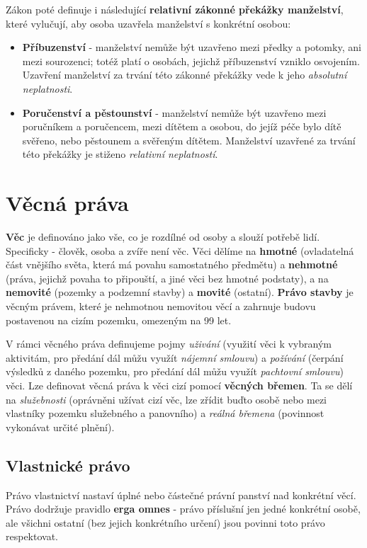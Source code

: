 Zákon poté definuje i následující \textbf{relativní zákonné překážky manželství}, které vylučují, aby osoba uzavřela manželství s konkrétní osobou:

\begin{itemize}
    \item \textbf{Příbuzenství} - manželství nemůže být uzavřeno mezi předky a potomky, ani mezi sourozenci; totéž platí o osobách, jejichž příbuzenství vzniklo osvojením. Uzavření manželství za trvání této zákonné překážky vede k jeho \textit{absolutní neplatnosti}.
    \item \textbf{Poručenství a pěstounství} - manželství nemůže být uzavřeno mezi poručníkem a poručencem, mezi dítětem a osobou, do jejíž péče bylo dítě svěřeno, nebo pěstounem a svěřeným dítětem. Manželství uzavřené za trvání této překážky je stiženo \textit{relativní neplatností}.
\end{itemize}

\section{Věcná práva}

\textbf{Věc} je definováno jako vše, co je rozdílné od osoby a slouží potřebě lidí. Specificky - člověk, osoba a zvíře není věc. Věci dělíme na \textbf{hmotné} (ovladatelná část vnějšího světa, která má povahu samostatného předmětu) a \textbf{nehmotné} (práva, jejichž povaha to připouští, a jiné věci bez hmotné podstaty), a na \textbf{nemovité} (pozemky a podzemní stavby) a \textbf{movité} (ostatní). \textbf{Právo stavby} je věcným právem, které je nehmotnou nemovitou věcí a zahrnuje budovu postavenou na cizím pozemku, omezeným na 99 let.

V rámci věcného práva definujeme pojmy \textit{uživání} (využití věci k vybraným aktivitám, pro předání dál můžu využít \textit{nájemní smlouvu}) a \textit{požívání} (čerpání výsledků z daného pozemku, pro předání dál můžu využít \textit{pachtovní smlouvu}) věci. Lze definovat věcná práva k věci cizí pomocí \textbf{věcných břemen}. Ta se dělí na \textit{služebnosti} (oprávněni užívat cizí věc, lze zřídit buďto osobě nebo mezi vlastníky pozemku služebného a panovního) a \textit{reálná břemena} (povinnost vykonávat určité plnění).

\subsection{Vlastnické právo}

Právo vlastnictví nastaví úplné nebo částečné právní panství nad konkrétní věcí. Právo dodržuje pravidlo \textbf{erga omnes} - právo příslušní jen jedné konkrétní osobě, ale všichni ostatní (bez jejich konkrétního určení) jsou povinni toto právo respektovat.

